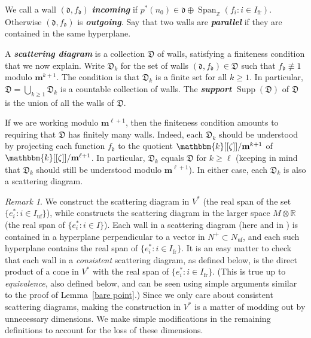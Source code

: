 \documentclass{amsart}
\theoremstyle{definition}
\theoremstyle{remark}
\newtheorem{remark}[proposition]{Remark}
\numberwithin{equation}{section}
\newcommand{\newword}[1]{\textbf{\emph{#1}}}
\newcommand{\integers}{\mathbb Z}
\newcommand{\reals}{\mathbb R}
\newcommand{\uf}{{\operatorname{uf}}}
\newcommand{\fr}{{\operatorname{fr}}}
\newcommand{\set}[1]{{\lbrace #1 \rbrace}}
\newcommand{\D}{{\mathfrak D}}
\newcommand{\0}{{\mathbf{0}}}
\DeclareMathOperator{\Span}{Span}
\newcommand{\m}{\mathbf{m}}
\renewcommand{\k}{\mathbbm{k}}
\newcommand{\Supp}{\operatorname{Supp}}
\renewcommand{\d}{{\mathfrak d}}
\begin{document}
We call a wall $(\d,f_\d)$ \newword{incoming} if $p^*(n_0)\in\d\oplus\Span_\integers(f_i:i\in I_\fr)$.  
Otherwise $(\d,f_\d)$ is \newword{outgoing}.
Say that two walls are \newword{parallel} if they are contained in the same hyperplane.

A \newword{scattering diagram} is a collection $\D$ of walls, satisfying a finiteness condition that we now explain.
Write $\D_k$ for the set of walls $(\d,f_\d)\in\D$ such that $f_\d\not\equiv 1$ modulo $\m^{k+1}$.
The condition is that $\D_k$ is a finite set for all $k\ge 1$.
In particular, $\D=\bigcup_{k\ge1}\D_k$ is a countable collection of walls.
The \newword{support} $\Supp(\D)$ of $\D$ is the union of all the walls of $\D$.

If we are working modulo $\m^{\ell+1}$, then the finiteness condition amounts to requiring that $\D$ has finitely many walls.
Indeed, each $\D_k$ should be understood by projecting each function $f_\d$ to the quotient $\k[[\zeta]]/\m^{k+1}$ of $\k[[\zeta]]/\m^{\ell+1}$.
In particular, $\D_k$ equals $\D$ for $k\ge\ell$ (keeping in mind that $\D_k$ should still be understood modulo $\m^{\ell+1}$).
In either case, each $\D_k$ is also a scattering diagram.

\begin{remark}\label{useless dimensions}
We construct the scattering diagram in $V^*$ (the real span of the set $\set{e_i^*:i\in I_\uf}$), while \cite{GHKK} constructs the scattering diagram in the larger space $M\otimes\reals$ (the real span of $\set{e_i^*:i\in I}$).
Each wall in a scattering diagram (here and in \cite{GHKK}) is contained in a hyperplane perpendicular to a vector in $N^+\subset N_\uf$, and each such hyperplane contains the real span of $\set{e_i^*:i\in I_\fr}$.
It is an easy matter to check that each wall in a \emph{consistent} scattering diagram, as defined below, is the direct product of a cone in $V^*$ with the real span of $\set{e_i^*:i\in I_\fr}$.
(This is true up to \emph{equivalence}, also defined below, and can be seen using simple arguments similar to the proof of Lemma~\ref{bare point}.)
Since we only care about consistent scattering diagrams, making the construction in $V^*$ is a matter of modding out by unnecessary dimensions.
We make simple modifications in the remaining definitions to account for the loss of these dimensions.
\end{remark}
\end{document}
